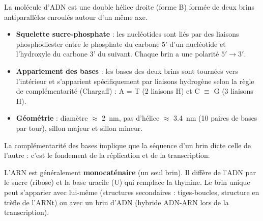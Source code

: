 \documentclass[11pt]{article}
\newcommand{\cle}[1]{{\popxbold\color{popdark}#1}}
\begin{document}
\begin{propriete}
La molécule d'ADN est une \cle{double hélice} droite (forme B) formée de deux brins \cle{antiparallèles} enroulés autour d'un même axe.
\begin{itemize}
\item \textbf{Squelette sucre-phosphate} : les nucléotides sont liés par des \cle{liaisons phosphodiester} entre le phosphate du carbone 5' d'un nucléotide et l'hydroxyle du carbone 3' du suivant. Chaque brin a une polarité $5' \rightarrow 3'$.
\item \textbf{Appariement des bases} : les bases des deux brins sont tournées vers l'intérieur et s'apparient spécifiquement par \cle{liaisons hydrogène} selon la \cle{règle de complémentarité} (Chargaff) : A = T (2 liaisons H) et C $\equiv$ G (3 liaisons H).
\item \textbf{Géométrie} : diamètre $\approx$ \SI{2}{nm}, pas d'hélice $\approx$ \SI{3,4}{nm} (10 paires de bases par tour), sillon majeur et sillon mineur.
\end{itemize}
La complémentarité des bases implique que la séquence d'un brin dicte celle de l'autre : c'est le fondement de la réplication et de la transcription.
\end{propriete}

\begin{propriete}
L'ARN est généralement \textbf{monocaténaire} (un seul brin). Il diffère de l'ADN par le sucre (ribose) et la base uracile (U) qui remplace la thymine. Le brin unique peut s'apparier avec lui-même (structures secondaires : tiges-boucles, structure en trèfle de l'ARNt) ou avec un brin d'ADN (hybride ADN-ARN lors de la transcription).
\end{propriete}
\end{document}
